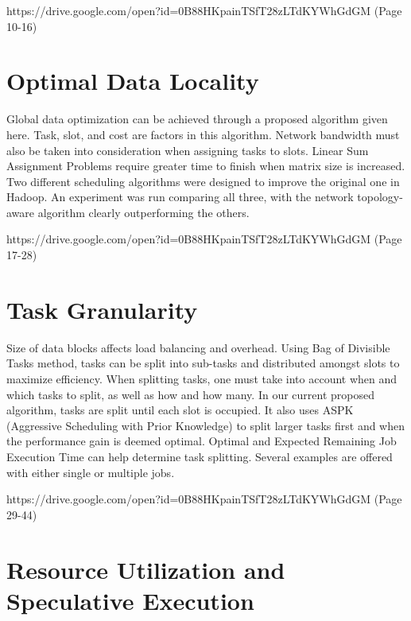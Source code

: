 
{https://drive.google.com/open?id=0B88HKpainTSfT28zLTdKYWhGdGM
  (Page 10-16)}

\section{Optimal Data Locality}

Global data optimization can be achieved through a proposed algorithm
given here. Task, slot, and cost are factors in this algorithm. Network
bandwidth must also be taken into consideration when assigning tasks to
slots. Linear Sum Assignment Problems require greater time to finish
when matrix size is increased. Two different scheduling algorithms were
designed to improve the original one in Hadoop. An experiment was run
comparing all three, with the network topology-aware algorithm clearly
outperforming the others.


{https://drive.google.com/open?id=0B88HKpainTSfT28zLTdKYWhGdGM
  (Page 17-28)}

\section{Task Granularity}

Size of data blocks affects load balancing and overhead. Using Bag of
Divisible Tasks method, tasks can be split into sub-tasks and
distributed amongst slots to maximize efficiency. When splitting tasks,
one must take into account when and which tasks to split, as well as how
and how many. In our current proposed algorithm, tasks are split until
each slot is occupied. It also uses ASPK (Aggressive Scheduling with
Prior Knowledge) to split larger tasks first and when the performance
gain is deemed optimal. Optimal and Expected Remaining Job Execution
Time can help determine task splitting. Several examples are offered
with either single or multiple jobs.


{https://drive.google.com/open?id=0B88HKpainTSfT28zLTdKYWhGdGM
  (Page 29-44)}

\section{Resource Utilization and Speculative Execution}

